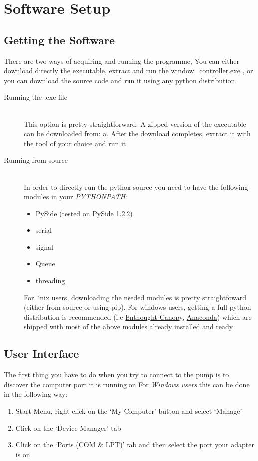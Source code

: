 \documentclass[a4paper]{article}
\begin{document}
\section{Software Setup}
\subsection{Getting the Software}
There are two ways of acquiring and running the programme,
You can either download directly the executable, extract and run the window\_controller.exe
, or you can download the source code and run it using any python distribution.

\begin{description}
    \item[Running the .exe file] \hfill\\
        This option is pretty straightforward. A zipped version of the executable 
        can be downloaded from: \url{a}.%
        After the download completes, extract it with the tool of your choice and 
        run it
    \item[Running from source] \hfill\\
        In order to directly run the python source you need to have the following modules
        in your \textit{PYTHONPATH}:
        \begin{itemize}
            \item PySide (tested on PySide 1.2.2)
            \item serial
            \item signal
            \item Queue
            \item threading
        \end{itemize}
        For *nix users, downloading the needed modules 
        is pretty straightfoward (either from source or using pip). 
        For windows users, getting a full python distribution is recommended (i.e \href{https://www.enthought.com/}{Enthought-Canopy}, \href{http://www.continuum.io/}{Anaconda})
        which are shipped with most of the above modules already installed and ready
\end{description}

\subsection{User Interface}
The first thing you have to do when you try to connect to the pump is to discover the computer port it is running on
For \emph{Windows users} this can be done in the following way:
\begin{enumerate}
    \item Start Menu, right click on the `My Computer' button and select `Manage'
    \item Click on the `Device Manager' tab
    \item Click on the `Ports (COM \& LPT)' tab and then select the port your adapter is on
\end{enumerate}
\end{document}
